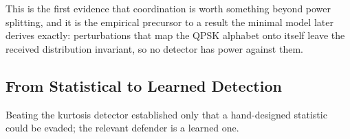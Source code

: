 \documentclass[conference]{IEEEtran}
\begin{document}
This is the first evidence that coordination is worth something beyond power splitting, and it is the empirical precursor to a result the minimal model later derives exactly: perturbations that map the QPSK alphabet onto itself leave the received distribution invariant, so no detector has power against them.

\subsection{From Statistical to Learned Detection}
Beating the kurtosis detector established only that a hand-designed statistic could be evaded; the relevant defender is a learned one.

\ifCLASSOPTIONcaptionsoff
  \newpage
\fi

\nocite{*}


\end{document}
